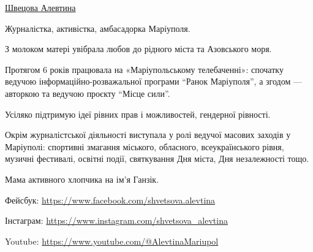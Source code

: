 
 
 
 
 

\href{https://donbas24.news/author/alevtina-svecova}{Швецова Алевтина}

Журналістка, активістка, амбасадорка Маріуполя.

З молоком матері увібрала любов до рідного міста та Азовського моря.

Протягом 6 років працювала на «Маріупольському телебаченні»: спочатку ведучою
інформаційно-розважальної програми \enquote{Ранок Маріуполя}, а згодом — авторкою та
ведучою проєкту \enquote{Місце сили}.

Усіляко підтримую ідеї рівних прав і можливостей, гендерної рівності.

Окрім журналістської діяльності виступала у ролі ведучої масових заходів у
Маріуполі: спортивні змагання міського, обласного, всеукраїнського рівня,
музичні фестивалі, освітні події, святкування Дня міста, Дня незалежності тощо.

Мама активного хлопчика на ім'я Ганзік.

Фейсбук: \url{https://www.facebook.com/shvetsova.alevtina}\par
Інстаграм: \url{https://www.instagram.com/shvetsova_alevtina}\par
Youtube: \url{https://www.youtube.com/@AlevtinaMariupol}
